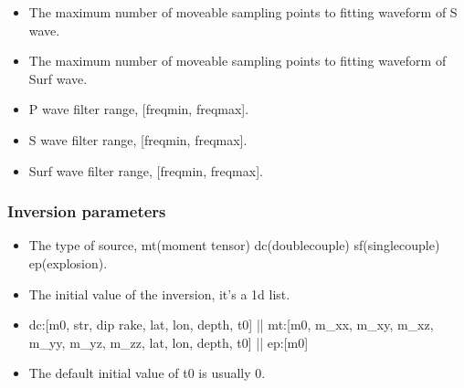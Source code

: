 \documentclass[a4paper,10pt,english,openany]{sphinxmanual}
\begin{document}
\begin{itemize}
\item {} 
The maximum number of moveable sampling points to fitting waveform of S wave.

\end{itemize}

\begin{itemize}
\item {} 
The maximum number of moveable sampling points to fitting waveform of Surf wave.

\end{itemize}

\begin{itemize}
\item {} 
P wave filter range, {[}freqmin, freqmax{]}.

\end{itemize}

\begin{itemize}
\item {} 
S wave filter range, {[}freqmin, freqmax{]}.

\end{itemize}

\begin{itemize}
\item {} 
Surf wave filter range, {[}freqmin, freqmax{]}.

\end{itemize}


\subsubsection{Inversion parameters}
\label{\detokenize{tutorials/S4_Inv_DC:inversion-parameters}}
\begin{itemize}
\item {} 
The type of source, mt(moment tensor) dc(double\sphinxhyphen{}couple) sf(single\sphinxhyphen{}couple) ep(explosion).

\end{itemize}

\begin{itemize}
\item {} 
The initial value of the inversion, it’s a 1\sphinxhyphen{}d list.

\item {} 
dc:{[}m0, str, dip rake, lat, lon, depth, t0{]} || mt:{[}m0, m\_xx, m\_xy, m\_xz, m\_yy, m\_yz, m\_zz, lat, lon, depth, t0{]} || ep:{[}m0{]}

\item {} 
The default initial value of t0 is usually 0.

\end{itemize}
\end{document}
